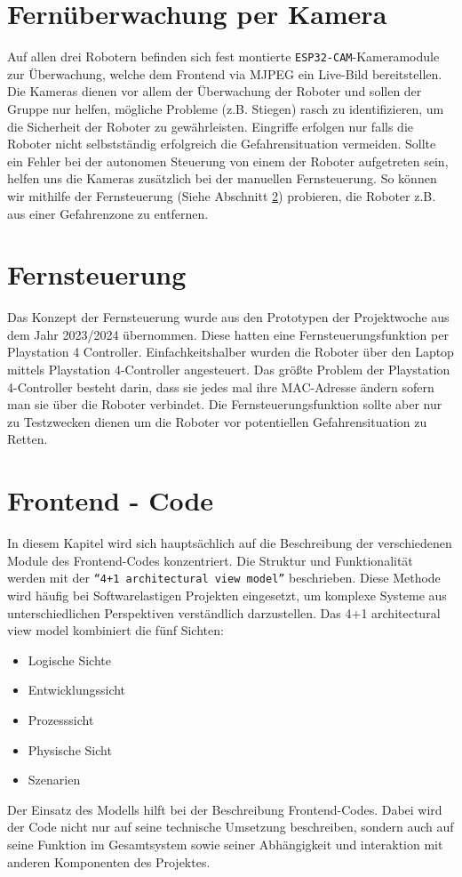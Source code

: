 \section{Fernüberwachung per Kamera}
\label{subsec:frontend_cam_stream}
Auf allen drei Robotern befinden sich fest montierte
\texttt{ESP32-CAM}-Kameramodule zur Überwachung,
welche dem Frontend via MJPEG ein Live-Bild bereitstellen.
%
Die Kameras dienen vor allem der Überwachung der Roboter und sollen der Gruppe nur helfen,
mögliche Probleme (z.B. Stiegen) rasch zu identifizieren,
um die Sicherheit der Roboter zu gewährleisten.
%
Eingriffe erfolgen nur falls die Roboter nicht selbstständig erfolgreich die Gefahrensituation vermeiden.
%
Sollte ein Fehler bei der autonomen Steuerung von einem der Roboter aufgetreten sein,
helfen uns die Kameras zusätzlich bei der manuellen Fernsteuerung.
%
So können wir mithilfe der Fernsteuerung (Siehe Abschnitt \ref{subsec:frontend_control}) probieren,
die Roboter z.B. aus einer Gefahrenzone zu entfernen.

\section{Fernsteuerung}
\label{subsec:frontend_control}
Das Konzept der Fernsteuerung wurde aus den Prototypen der Projektwoche aus dem Jahr 2023/2024 übernommen.
%
Diese hatten eine Fernsteuerungsfunktion per Playstation 4 Controller. Einfachkeitshalber wurden die Roboter über 
den Laptop mittels Playstation 4-Controller angesteuert. 
%
Das größte Problem der Playstation 4-Controller besteht darin, dass sie jedes mal ihre MAC-Adresse ändern sofern
man sie über die Roboter verbindet.  
%
Die Fernsteuerungsfunktion sollte aber nur zu Testzwecken dienen um die Roboter 
vor potentiellen Gefahrensituation zu Retten. 

\section{Frontend - Code}
\label{subsec:frontend_Code}
In diesem Kapitel wird sich hauptsächlich auf die Beschreibung der verschiedenen Module des
Frontend-Codes konzentriert. Die Struktur und Funktionalität werden mit der \texttt{``4+1 architectural view model''} beschrieben.
%
Diese Methode wird häufig bei Softwarelastigen Projekten eingesetzt, um komplexe Systeme aus unterschiedlichen
Perspektiven verständlich darzustellen.
Das 4+1 architectural view model kombiniert die fünf Sichten:
\begin{itemize}
  \item Logische Sichte
  \item Entwicklungssicht
  \item Prozesssicht
  \item Physische Sicht
  \item Szenarien
\end{itemize} 
Der Einsatz des Modells hilft bei der Beschreibung Frontend-Codes. 
Dabei wird der Code nicht nur auf seine technische Umsetzung beschreiben,
sondern auch auf seine Funktion im Gesamtsystem 
sowie seiner Abhängigkeit und interaktion mit anderen Komponenten des Projektes.


